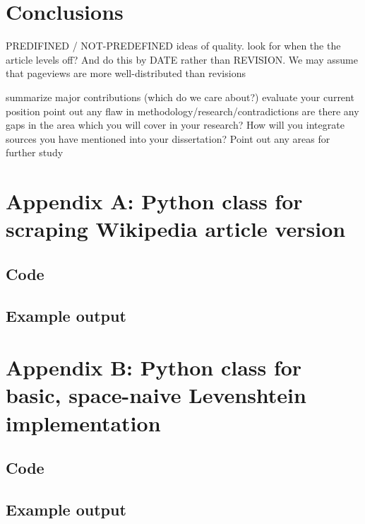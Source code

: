 \documentclass[a4paper,11pt,twoside,notitlepage]{article}
\begin{document}
        \section{Conclusions}

        PREDIFINED / NOT-PREDEFINED ideas of quality. look for when
        the the article levels off? And do this by DATE rather than
        REVISION. We may assume that pageviews are more
        well-distributed than revisions

        summarize major contributions (which do we care about?)
        evaluate your current position
        point out any flaw in methodology/research/contradictions
        are there any gaps in the area which you will cover in your research?
        How will you integrate sources you have mentioned into your dissertation?
        Point out any areas for further study

\clearpage
\begin{appendices}
\section{Appendix A: Python class for scraping Wikipedia article version}
\subsection{Code}

\subsection{Example output}

\clearpage
\section{Appendix B: Python class for basic, space-naive Levenshtein
  implementation}
\subsection{Code}

\subsection{Example output}
\end{appendices}

{}
	
\end{document}
